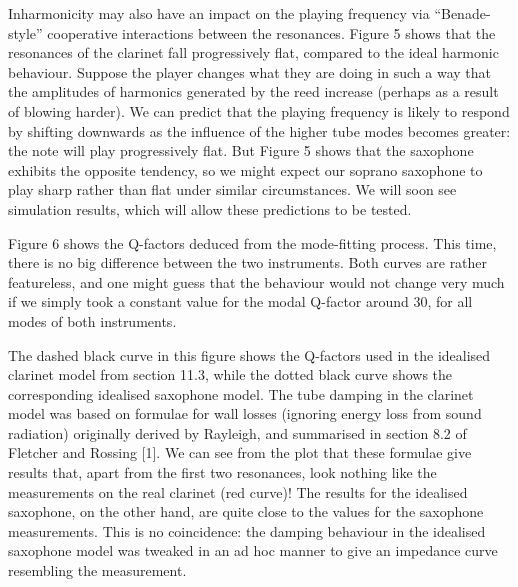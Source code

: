   Inharmonicity may also have an impact on the playing frequency via 
  “Benade-style” cooperative interactions between the resonances. Figure 5 
  shows that the resonances of the clarinet fall progressively flat, compared 
  to the ideal harmonic behaviour. Suppose the player changes what they are 
  doing in such a way that the amplitudes of harmonics generated by the reed 
  increase (perhaps as a result of blowing harder). We can predict that the 
  playing frequency is likely to respond by shifting downwards as the influence 
  of the higher tube modes becomes greater: the note will play progressively 
  flat. But Figure 5 shows that the saxophone exhibits the opposite tendency, 
  so we might expect our soprano saxophone to play sharp rather than flat under 
  similar circumstances. We will soon see simulation results, which will allow 
  these predictions to be tested. 

  Figure 6 shows the Q-factors deduced from the mode-fitting process. This 
  time, there is no big difference between the two instruments. Both curves are 
  rather featureless, and one might guess that the behaviour would not change 
  very much if we simply took a constant value for the modal Q-factor around 
  30, for all modes of both instruments. 


  The dashed black curve in this figure shows the Q-factors used in the 
  idealised clarinet model from section 11.3, while the dotted black curve 
  shows the corresponding idealised saxophone model. The tube damping in the 
  clarinet model was based on formulae for wall losses (ignoring energy loss 
  from sound radiation) originally derived by Rayleigh, and summarised in 
  section 8.2 of Fletcher and Rossing [1]. We can see from the plot that these 
  formulae give results that, apart from the first two resonances, look nothing 
  like the measurements on the real clarinet (red curve)! The results for the 
  idealised saxophone, on the other hand, are quite close to the values for the 
  saxophone measurements. This is no coincidence: the damping behaviour in the 
  idealised saxophone model was tweaked in an ad hoc manner to give an 
  impedance curve resembling the measurement. 

